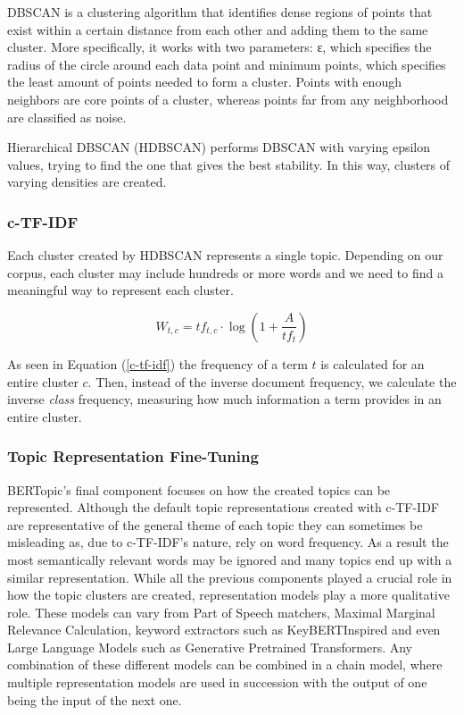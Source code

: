 DBSCAN \citep{10.5555/3001460.3001507} is a clustering algorithm that identifies dense regions of points that exist within a certain distance from each other and adding them to the same cluster. More specifically, it works with two parameters: \textgreek{ε}, which specifies the radius of the circle around each data point and minimum points, which specifies the least amount of points needed to form a cluster. Points with enough neighbors are core points of a cluster, whereas points far from any neighborhood are classified as noise.

Hierarchical DBSCAN (HDBSCAN) \citep{McInnes2017} performs DBSCAN with varying epsilon values, trying to find the one that gives the best stability. In this way, clusters of varying densities are created.

\subsubsection{c-TF-IDF}
Each cluster created by HDBSCAN represents a single topic. Depending on our corpus, each cluster may include hundreds or more words and we need to find a meaningful way to represent each cluster. 

\begin{equation}\label{c-tf-idf}
W_{t,c} = tf_{t,c} \cdot \log(1 + \frac{A}{tf_{t}})
\end{equation}

As seen in Equation (\ref{c-tf-idf}) the frequency of a term $t$ is calculated for an entire cluster $c$. Then, instead of the inverse document frequency, we calculate the inverse \textit{class} frequency, measuring how much information a term provides in an entire cluster.

\subsubsection{Topic Representation Fine-Tuning}
BERTopic's final component focuses on how the created topics can be represented. Although the default topic representations created with c-TF-IDF are representative of the general theme of each topic they can sometimes be misleading as, due to c-TF-IDF's nature, rely on word frequency. As a result the most semantically relevant words may be ignored and many topics end up with a similar representation. While all the previous components played a crucial role in how the topic clusters are created, representation models play a more qualitative role. These models can vary from Part of Speech matchers, Maximal Marginal Relevance Calculation, keyword extractors such as KeyBERTInspired and even Large Language Models such as Generative Pretrained Transformers. Any combination of these different models can be combined in a chain model, where multiple representation models are used in succession with the output of one being the input of the next one.

